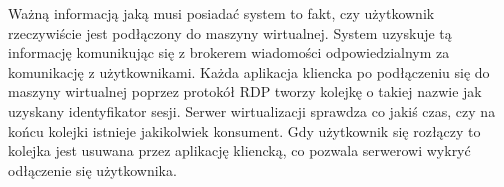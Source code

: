 \documentclass[../opis-rozwiazania.tex]{subfiles}
\begin{document}
\label{communication:user-broker}

Ważną informacją jaką musi posiadać system to fakt, czy użytkownik rzeczywiście jest podłączony do maszyny wirtualnej.
System uzyskuje tą informację komunikując się z brokerem wiadomości odpowiedzialnym za komunikację z użytkownikami.
Każda aplikacja kliencka po podłączeniu się do maszyny wirtualnej poprzez protokół RDP tworzy kolejkę o takiej nazwie jak uzyskany identyfikator sesji.
Serwer wirtualizacji sprawdza co jakiś czas, czy na końcu kolejki istnieje jakikolwiek konsument.
Gdy użytkownik się rozłączy to kolejka jest usuwana przez aplikację kliencką, co pozwala serwerowi wykryć odłączenie się użytkownika.
\end{document}
